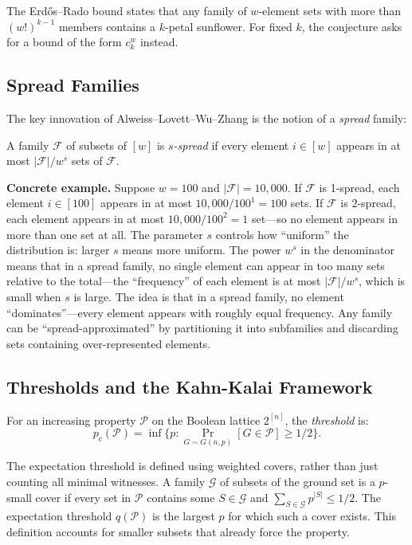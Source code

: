 The Erd\H{o}s--Rado bound states that any family of $w$-element sets with more than $(w!)^{k-1}$ members contains a $k$-petal sunflower. For fixed $k$, the conjecture asks for a bound of the form $c_k^w$ instead.

\subsection{Spread Families}

The key innovation of Alweiss--Lovett--Wu--Zhang is the notion of a \emph{spread} family:

\begin{definition}
A family $\mathcal{F}$ of subsets of $[w]$ is \emph{$s$-spread} if every element $i \in [w]$ appears in at most $|\mathcal{F}| / w^s$ sets of $\mathcal{F}$.
\end{definition}

\textbf{Concrete example.} Suppose $w = 100$ and $|\mathcal{F}| = 10{,}000$. If $\mathcal{F}$ is 1-spread, each element $i \in [100]$ appears in at most $10{,}000 / 100^1 = 100$ sets. If $\mathcal{F}$ is 2-spread, each element appears in at most $10{,}000 / 100^2 = 1$ set---so no element appears in more than one set at all. The parameter $s$ controls how ``uniform'' the distribution is: larger $s$ means more uniform. The power $w^s$ in the denominator means that in a spread family, no single element can appear in too many sets relative to the total---the ``frequency'' of each element is at most $|\mathcal{F}|/w^s$, which is small when $s$ is large. The idea is that in a spread family, no element ``dominates''---every element appears with roughly equal frequency. Any family can be ``spread-approximated'' by partitioning it into subfamilies and discarding sets containing over-represented elements.

\subsection{Thresholds and the Kahn-Kalai Framework}

For an increasing property $\mathcal{P}$ on the Boolean lattice $2^{[n]}$, the \emph{threshold} is:
\[
p_c(\mathcal{P}) = \inf\{p : \Pr_{G \sim G(n,p)}[G \in \mathcal{P}] \ge 1/2\}.
\]

The expectation threshold is defined using weighted covers, rather than just counting all minimal witnesses. A family $\mathcal{G}$ of subsets of the ground set is a $p$-small cover if every set in $\mathcal{P}$ contains some $S\in\mathcal{G}$ and $\sum_{S\in\mathcal{G}}p^{|S|}\leq 1/2$. The expectation threshold $q(\mathcal{P})$ is the largest $p$ for which such a cover exists. This definition accounts for smaller subsets that already force the property.

